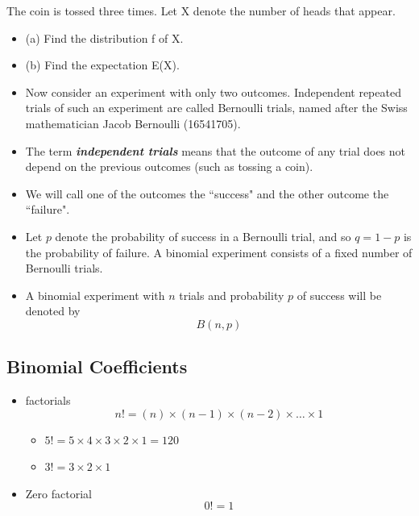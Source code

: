 \documentclass[12pt]{report}
\begin{document}
	The coin is tossed three times. Let X denote the number of
	heads that appear.
	\begin{itemize}
		\item (a) Find the distribution f of X.
		\item (b) Find the expectation E(X).
	\end{itemize}
	
	\begin{itemize}
		\item Now consider an experiment with only two outcomes. Independent repeated trials of such an experiment are
		called Bernoulli trials, named after the Swiss mathematician Jacob Bernoulli (16541705). \item The term \textbf{\emph{independent
				trials}} means that the outcome of any trial does not depend on the previous outcomes (such as tossing a coin).
		\item We will call one of the outcomes the ``success" and the other outcome the ``failure".
	\end{itemize}
	
	\begin{itemize} \item
		Let $p$ denote the probability of success in a Bernoulli trial, and so $q = 1 - p$ is the probability of failure.
		A binomial experiment consists of a fixed number of Bernoulli trials. \item A binomial experiment with $n$ trials and
		probability $p$ of success will be denoted by
		\[B(n, p)\]
	\end{itemize}
	
	\subsection*{Binomial Coefficients}
\begin{itemize}
	\item factorials 
	\[ n! = (n)\times (n-1)\times(n-2) \times \ldots \times 1 \]
	\begin{itemize}
		\item $5! = 5 \times 4 \times 3 \times 2 \times 1 = 120 $
		\item $3! = 3 \times 2 \times 1$
	\end{itemize}
	\item Zero factorial
	\[ 0! =  1 \]
\end{itemize}
\end{document}
